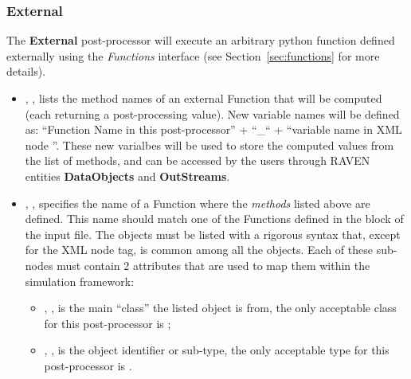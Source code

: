 \subsubsection{External}
\label{External}
The \textbf{External} post-processor will execute an arbitrary python function
defined externally using the \textit{Functions} interface (see
Section~\ref{sec:functions} for more details).
%


\begin{itemize}
  \item {}, ,
  lists the method names of an external Function that will be computed (each
  returning a post-processing value). \nb New variable names will be defined as:
  ``Function Name in this post-processor'' + ``\_`` + ``variable name in XML
  node ''. These new varialbes will be used to store the computed
  values from the list of methods, and can be accessed by the users through RAVEN
  entities \textbf{DataObjects} and \textbf{OutStreams}.
  \item {}, , specifies
  the name of a Function where the \textit{methods} listed above are defined.
  \nb This name should match one of the Functions defined in the
   block of the input file.
  The objects must be listed with a rigorous syntax that, except for the XML
  node tag, is common among all the objects.
  Each of these sub-nodes must contain 2 attributes that are used to map them
  within the simulation framework:

   \begin{itemize}
     \item {}, , is the main
     ``class'' the listed object is from, the only acceptable class for
     this post-processor is ;
     \item {}, , is the object
     identifier or sub-type, the only acceptable type for this post-processor is
     .
  \end{itemize}
\end{itemize}

